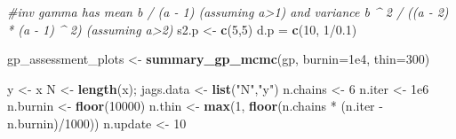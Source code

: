 \documentclass[author-year, review]{elsarticle} %
\newenvironment{Shaded}{}{}
\newcommand{\KeywordTok}[1]{\textcolor[rgb]{0.00,0.44,0.13}{\textbf{{#1}}}}
\newcommand{\DataTypeTok}[1]{\textcolor[rgb]{0.56,0.13,0.00}{{#1}}}
\newcommand{\DecValTok}[1]{\textcolor[rgb]{0.25,0.63,0.44}{{#1}}}
\newcommand{\FloatTok}[1]{\textcolor[rgb]{0.25,0.63,0.44}{{#1}}}
\newcommand{\StringTok}[1]{\textcolor[rgb]{0.25,0.44,0.63}{{#1}}}
\newcommand{\CommentTok}[1]{\textcolor[rgb]{0.38,0.63,0.69}{\textit{{#1}}}}
\newcommand{\NormalTok}[1]{{#1}}
\begin{document}
\begin{Shaded}
\begin{Highlighting}[]
\CommentTok{#inv gamma has mean b / (a - 1) (assuming a>1) and variance b ^ 2 / ((a - 2) * (a - 1) ^ 2) (assuming a>2)}
\NormalTok{s2.p <- }\KeywordTok{c}\NormalTok{(}\DecValTok{5}\NormalTok{,}\DecValTok{5}\NormalTok{)  }
\NormalTok{d.p = }\KeywordTok{c}\NormalTok{(}\DecValTok{10}\NormalTok{, }\DecValTok{1}\NormalTok{/}\FloatTok{0.1}\NormalTok{)}
\end{Highlighting}
\end{Shaded}

\begin{Shaded}
\end{Shaded}

\begin{Shaded}
\begin{Highlighting}[]
\NormalTok{gp_assessment_plots <- }\KeywordTok{summary_gp_mcmc}\NormalTok{(gp, }\DataTypeTok{burnin=}\FloatTok{1e4}\NormalTok{, }\DataTypeTok{thin=}\DecValTok{300}\NormalTok{)}
\end{Highlighting}
\end{Shaded}

\begin{Shaded}
\end{Shaded}

\begin{Shaded}
\begin{Highlighting}[]
\NormalTok{y <- x }
\NormalTok{N <- }\KeywordTok{length}\NormalTok{(x);}
\NormalTok{jags.data <- }\KeywordTok{list}\NormalTok{(}\StringTok{"N"}\NormalTok{,}\StringTok{"y"}\NormalTok{)}
\NormalTok{n.chains <- }\DecValTok{6}
\NormalTok{n.iter <- }\FloatTok{1e6}
\NormalTok{n.burnin <- }\KeywordTok{floor}\NormalTok{(}\DecValTok{10000}\NormalTok{)}
\NormalTok{n.thin <- }\KeywordTok{max}\NormalTok{(}\DecValTok{1}\NormalTok{, }\KeywordTok{floor}\NormalTok{(n.chains * (n.iter - n.burnin)/}\DecValTok{1000}\NormalTok{))}
\NormalTok{n.update <- }\DecValTok{10}
\end{Highlighting}
\end{Shaded}
\end{document}
